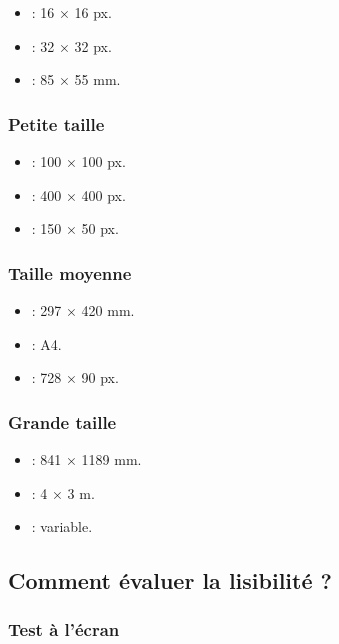 \begin{itemize}
    \item {} : 16 × 16 px.
    \item {} : 32 × 32 px.
    \item {} : 85 × 55 mm.
\end{itemize}

\subsubsection{Petite taille}

\begin{itemize}
    \item {} : 100 × 100 px.
    \item {} : 400 × 400 px.
    \item {} : 150 × 50 px.
\end{itemize}

\subsubsection{Taille moyenne}

\begin{itemize}
    \item {} : 297 × 420 mm.
    \item {} : A4.
    \item {} : 728 × 90 px.
\end{itemize}

\subsubsection{Grande taille}

\begin{itemize}
    \item {} : 841 × 1189 mm.
    \item {} : 4 × 3 m.
    \item {} : variable.
\end{itemize}

\subsection{Comment évaluer la lisibilité ?}

\subsubsection{Test à l'écran}

